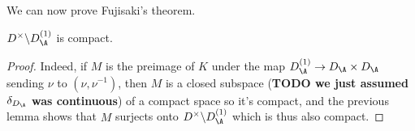 We can now prove Fujisaki's theorem.

\begin{theorem}
  $D^\times\backslash D_{\A}^{(1)}$ is compact.
\end{theorem}
\begin{proof}
  Indeed, if $M$ is the preimage of $K$ under the map $D_{\A}^{(1)} \to D_{\A}\times D_{\A}$
  sending $\nu$ to $(\nu,\nu^{-1})$, then $M$ is a closed subspace ({\bf TODO we just assumed $\delta_{D_{\A}}$
  was continuous}) of a compact
  space so it's compact, and the previous lemma shows that $M$ surjects onto
  $D^\times\backslash D_{\A}^{(1)}$ which is thus also compact.
\end{proof}
